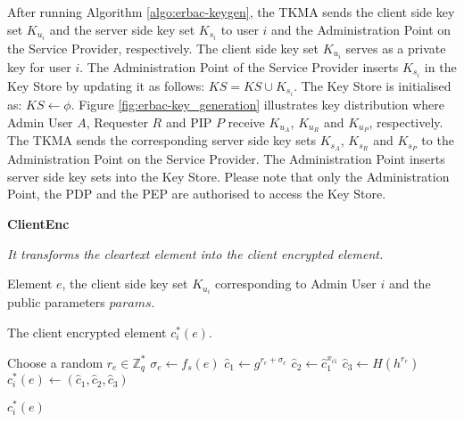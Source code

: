 \documentclass[epsfig,a4paper,11pt,titlepage]{book}
\numberwithin{algorithm}{chapter}
\newcommand{\algofontsize}{\fontsize{11}{12}\selectfont}
\begin{document}
After running Algorithm \ref{algo:erbac-keygen}, the \gls{TKMA} sends the client side key set $K_{u_i}$ and the server side key set $K_{s_i}$ to user $i$ and the Administration Point on the Service Provider, respectively. The client side key set $K_{u_i}$ serves as a private key for user $i$. The Administration Point of the Service Provider inserts $K_{s_i}$ in the Key Store by updating it as follows: $KS = KS \cup K_{s_i}$. The Key Store is initialised as: $KS \leftarrow \phi$. Figure \ref{fig:erbac-key_generation} illustrates key distribution where Admin User $A$, Requester $R$ and \gls{PIP} $P$ receive $K_{u_A}$, $K_{u_R}$ and $K_{u_P}$, respectively. The \gls{TKMA} sends the corresponding server side key sets $K_{s_A}$, $K_{s_R}$ and $K_{s_P}$ to the Administration Point on the Service Provider. The Administration Point inserts server side key sets into the Key Store. Please note that only the Administration Point, the \gls{PDP} and the \gls{PEP} are authorised to access the Key Store.



\begin{algorithm} [htp]
{\algofontsize
\caption{\textbf{ClientEnc}}

\label{algo:erbac-client-enc}

\begin{algorithmic}[1]

\INPUT \emph{It transforms the cleartext element into the client encrypted element.}

\Require Element $e$, the client side key set $K_{u_i}$ corresponding to Admin User $i$ and the public parameters $params$.

\Ensure The client encrypted element $c^*_i (e)$.

\medskip

\State Choose a random $r_e \in \mathbb{Z}^*_q$ \label{line:erbac-ce-r}
\State ${\sigma}_e \leftarrow f_s (e)$ \label{line:erbac-ce-sigma}
\State $\hat{c}_1 \leftarrow g^{r_e+{\sigma}_e}$ \label{line:erbac-ce-c1}
\State $\hat{c}_2 \leftarrow \hat{c}_1^{x_{i1}}$ \label{line:erbac-ce-c2}
\State $\hat{c}_3 \leftarrow H(h^{r_e})$ \label{line:erbac-ce-c3}
\State $c^*_i (e) \leftarrow (\hat{c}_1, \hat{c}_2, \hat{c}_3)$ \label{line:erbac-ce-c}

\Return $c^*_i (e)$

\end{algorithmic}
}
\end{algorithm}
\end{document}
